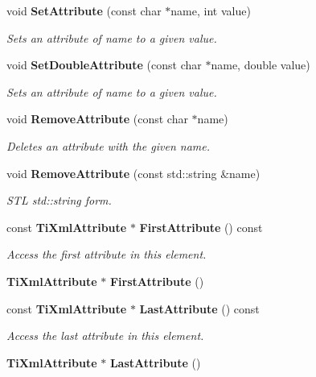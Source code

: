 \begin{CompactItemize}
\item 
void {\bf Set\-Attribute} (const char $\ast$name, int value)
\begin{CompactList}\small\item\em Sets an attribute of name to a given value. \item\end{CompactList}\item 
void {\bf Set\-Double\-Attribute} (const char $\ast$name, double value)
\begin{CompactList}\small\item\em Sets an attribute of name to a given value. \item\end{CompactList}\item 
void {\bf Remove\-Attribute} (const char $\ast$name)
\begin{CompactList}\small\item\em Deletes an attribute with the given name. \item\end{CompactList}\item 
void {\bf Remove\-Attribute} (const std::string \&name)\label{classTiXmlElement_TiXmlElementa22}

\begin{CompactList}\small\item\em STL std::string form. \item\end{CompactList}\item 
const {\bf Ti\-Xml\-Attribute} $\ast$ {\bf First\-Attribute} () const\label{classTiXmlElement_TiXmlElementa23}

\begin{CompactList}\small\item\em Access the first attribute in this element. \item\end{CompactList}\item 
{\bf Ti\-Xml\-Attribute} $\ast$ {\bf First\-Attribute} ()\label{classTiXmlElement_TiXmlElementa24}

\item 
const {\bf Ti\-Xml\-Attribute} $\ast$ {\bf Last\-Attribute} () const\label{classTiXmlElement_TiXmlElementa25}

\begin{CompactList}\small\item\em Access the last attribute in this element. \item\end{CompactList}\item 
{\bf Ti\-Xml\-Attribute} $\ast$ {\bf Last\-Attribute} ()\label{classTiXmlElement_TiXmlElementa26}


\end{CompactItemize}
